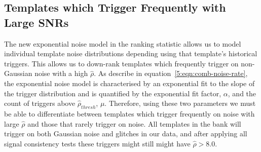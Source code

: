 \subsection{\label{5:sec:poor-temp-fits}Templates which Trigger Frequently with Large SNRs}



The new exponential noise model in the ranking statistic allows us to model individual template noise distributions depending using that template's historical triggers. This allows us to down-rank templates which frequently trigger on non-Gaussian noise with a high $\hat{\rho}$. As describe in equation~\ref{5:eqn:comb-noise-rate}, the exponential noise model is characterised by an exponential fit to the slope of the trigger distribution and is quantified by the exponential fit factor, $\alpha$, and the count of triggers above $\hat{\rho}_{thresh}$, $\mu$. Therefore, using these two parameters we must be able to differentiate between templates which trigger frequently on noise with large $\hat{\rho}$ and those that rarely trigger on noise. All templates in the bank will trigger on both Gaussian noise and glitches in our data, and after applying all signal consistency tests these triggers might still might have $\hat{\rho} > 8.0$. 

